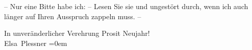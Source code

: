 \pstart
           – Nur eine Bitte habe ich: – Lesen Sie sie  und ungestört durch, wenn ich auch länger auf Ihren Ausspruch zappeln
               muss. –\pend
           
\pstart
           In unveränderlicher Verehrung Prosit Neujahr!{\\[\baselineskip]}\spacefill\mbox{Elsa Plessner}\pend
           \leftskip=0em{}\endnumbering{}
\begin{anhang}
\end{anhang}
      
